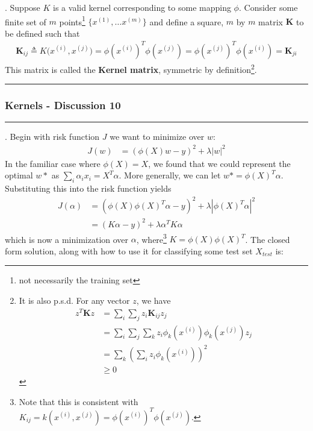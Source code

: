 \documentclass[12pt]{article}
\newcommand{\myspace}{\vspace{2\bigskipamount}}
\newcommand\p{\Needspace{10\baselineskip} \noindent}
\begin{document}
\myspace 
\p {}. Suppose $K$ is a valid kernel corresponding to some mapping $\phi$. Consider some finite set of $m$ points\footnote{not necessarily the training set} $\{x^{(1)}, \ldots x^{(m)} \}$ and define a square, $m$ by $m$ matrix $\mathbf{K}$ to be defined such that
\begin{align}
	\mathbf{K}_{ij} \triangleq K\big(x^{(i)}, x^{(j)} \big) = \phi(x^{(i)})^T \phi(x^{(j)}) = \phi(x^{(j)})^T \phi(x^{(i)}) = \mathbf{K}_{ji}
\end{align}
This matrix is called the \textbf{Kernel matrix}, symmetric by definition\footnote{It is also p.s.d. For any vector $z$, we have 
	\begin{align}
	z^T \mathbf{K} z &= \sum_i \sum_j z_i \mathbf{K}_{ij} z_j \\
	&= \sum_i \sum_j \sum_k z_i   \phi_k(x^{(i)}) \phi_k(x^{(j)})  z_j \\
	&= \sum_k \left(  \sum_i z_i  \phi_k(x^{(i)}) \right)^2 \\
	&\ge 0
	\end{align}
}.\\

\p {}




\myspace
\hrule 
\subsubsection{Kernels - Discussion 10}
\hrule 

\p {}. Begin with risk function $J$ we want to minimize over $w$:
\begin{align}
	J(w) &= \left( \phi(X) w - y \right)^2 + \lambda |w|^2 
\end{align}
In the familiar case where $\phi(X) = X$, we found that we could represent the optimal $w*$ as $\sum_i \alpha_i x_i = X^T\alpha$. More generally, we can let $w* = \phi(X)^T \alpha$. Substituting this into the risk function yields
\begin{align}
	J(\alpha) &= \left( \phi(X)\phi(X)^T \alpha - y \right)^2 + \lambda |\phi(X)^T \alpha|^2  \\
	&=  \left( K \alpha - y \right)^2 + \lambda \alpha^T K \alpha
\end{align}
which is now a minimization over $\alpha$, where\footnote{Note that this is consistent with $K_{ij} = k(x^{(i)}, x^{(j)}) = \phi(x^{(i)})^T \phi(x^{(j)})$. } $K = \phi(X)\phi(X)^T$. The closed form solution, along with how to use it for classifying some test set $X_{test}$ is:
\end{document}
